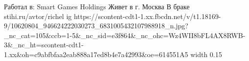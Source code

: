  
 
 
 
 

\par
Работал в: Smart Games Holdings
Живет в г. Москва
В браке
stihi.ru/avtor/richel
\ifcmt
  ig https://scontent-cdt1-1.xx.fbcdn.net/v/t1.18169-9/10620804_946624222030273_6831005432107988918_n.jpg?_nc_cat=105&ccb=1-5&_nc_sid=e3f864&_nc_ohc=Wz4WII8bFL4AX8RWB-3&_nc_ht=scontent-cdt1-1.xx&oh=c9abfbfaa2eab888a17ed8b4e7a42993&oe=614551A5
  width 0.15
\fi

